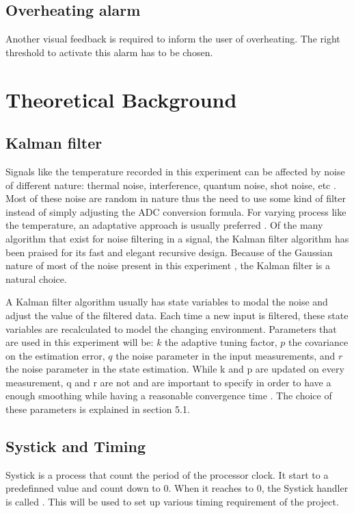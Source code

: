 \documentclass[12pt]{article}
\begin{document}
\subsection{Overheating alarm}
Another visual feedback is required to inform the user of overheating. The right threshold to activate this alarm has to be chosen.

\section{Theoretical Background}
\subsection{Kalman filter}
Signals like the temperature recorded in this experiment can be affected by noise of different nature: thermal noise, interference, quantum noise, shot noise, etc \cite{kuo1995active}. Most of these noise are random in nature thus the need to use some kind of filter instead of simply adjusting the ADC conversion formula. For varying process like the temperature, an adaptative approach is usually preferred \cite{kuo1995active}. Of the many algorithm that exist for noise filtering in a signal, the Kalman filter algorithm \cite{kalman1960new} has been praised for its fast and elegant recursive design. Because of the Gaussian nature of most of the noise present in this experiment \cite{kish2000noise}, the Kalman filter is a natural choice. 

A Kalman filter algorithm usually has state variables to modal the noise and adjust the value of the filtered data. Each time a new input is filtered, these state variables are recalculated to model the changing environment. Parameters that are used in this experiment will be: $k$ the  adaptive  tuning  factor, $p$ the covariance on the estimation error, $q$ the noise parameter in the  input  measurements,  and $r$ the noise parameter in the  state  estimation. While k and p are updated on every measurement, q and r are not and are important to specify in order to have a enough smoothing while having a reasonable convergence time \cite{kalman1960new}. The choice of these parameters is explained in section 5.1.

\subsection{Systick and Timing}
Systick is a process that count the period of the processor clock. It start to a predefinned value and count down to 0. When it reaches to 0, the Systick handler is called \cite{STMCubeDatasheet}. This will be used to set up various timing requirement of the project.
\end{document}
